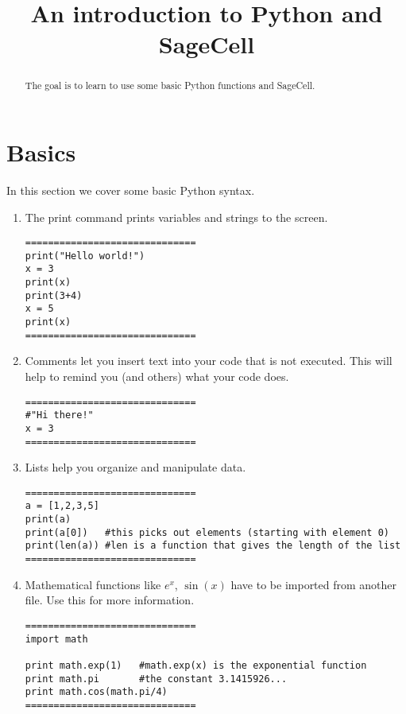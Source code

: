 \documentclass{ximera}
\title{An introduction to Python and SageCell}
\begin{document}
\begin{abstract}  
The goal is to learn to use some basic Python functions and SageCell.
\end{abstract}  
\maketitle

\section{Basics}

In this section we cover some basic Python syntax.

    \begin{enumerate}
        \item The print command prints variables and strings to the screen.
\begin{verbatim}
==============================
print("Hello world!")
x = 3
print(x)
print(3+4)
x = 5
print(x)
==============================
\end{verbatim}

	\item Comments let you insert text into your code that is not executed. This will help to remind you (and others) what your code does.
\begin{verbatim}
==============================
#"Hi there!"
x = 3
==============================
\end{verbatim}
	\item Lists help you organize and manipulate data.
\begin{verbatim}
==============================
a = [1,2,3,5]
print(a)
print(a[0])   #this picks out elements (starting with element 0)
print(len(a)) #len is a function that gives the length of the list
==============================
\end{verbatim}
	\item Mathematical functions like $e^x$, $\sin(x)$ have to be imported from another file. Use this  for more information.
\begin{verbatim}
==============================
import math

print math.exp(1)   #math.exp(x) is the exponential function
print math.pi       #the constant 3.1415926...
print math.cos(math.pi/4)
==============================
\end{verbatim}
    \end{enumerate}
\end{document}
